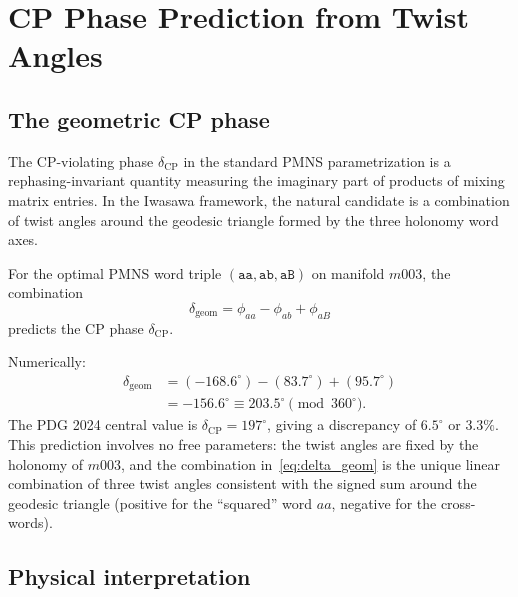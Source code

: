 \documentclass[epjc3]{svjour3}
\begin{document}
\section{CP Phase Prediction from Twist Angles}
\label{sec:prediction}

\subsection{The geometric CP phase}

The CP-violating phase $\delta_{\mathrm{CP}}$ in the standard
PMNS parametrization is a rephasing-invariant quantity measuring
the imaginary part of products of mixing matrix entries.
In the Iwasawa framework, the natural candidate is a combination
of twist angles around the geodesic triangle formed by the three
holonomy word axes.

\begin{proposition}
\label{prop:cp_phase}
For the optimal PMNS word triple $(\texttt{aa}, \texttt{ab}, \texttt{aB})$
on manifold $m003$, the combination
\begin{equation}
\delta_{\mathrm{geom}} = \phi_{aa} - \phi_{ab} + \phi_{aB}
\label{eq:delta_geom}
\end{equation}
predicts the CP phase $\delta_{\mathrm{CP}}$.
\end{proposition}

Numerically:
\begin{align}
\delta_{\mathrm{geom}} &= (-168.6^\circ) - (83.7^\circ) + (95.7^\circ) \nonumber \\
&= -156.6^\circ \equiv 203.5^\circ \pmod{360^\circ}.
\label{eq:delta_num}
\end{align}
The PDG 2024 central value is $\delta_{\mathrm{CP}} = 197^\circ$,
giving a discrepancy of $6.5^\circ$ or $3.3\%$.
This prediction involves no free parameters: the twist angles
are fixed by the holonomy of $m003$, and the combination
in~\eqref{eq:delta_geom} is the unique linear combination
of three twist angles consistent with the signed sum around
the geodesic triangle (positive for the ``squared'' word $aa$,
negative for the cross-words).

\subsection{Physical interpretation}
\end{document}
